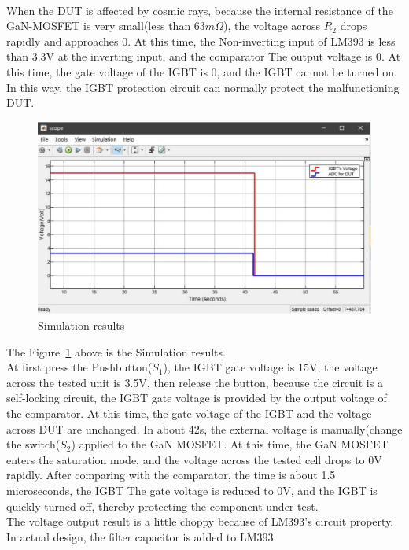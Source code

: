  
\\
When the DUT is affected by cosmic rays, because the internal resistance of the GaN-MOSFET is very small(less than $63m\Omega$), the voltage across $R_{2}$ drops rapidly and approaches 0. At this time, the Non-inverting input of LM393 is less than 3.3V at the inverting input, and the comparator The output voltage is 0. At this time, the gate voltage of the IGBT is 0, and the IGBT cannot be turned on. In this way, the IGBT protection circuit can normally protect the malfunctioning DUT.




\begin{figure}[!ht]
	\centering
	\includegraphics[width=13cm]{grafiken/3.4.pdf}
	\caption{Simulation results} 
	\label{fig:3.4}
\end{figure}
\FloatBarrier
The Figure~\ref{fig:3.4} above is the Simulation results.
\\


At first press the Pushbutton($S_{1}$), the IGBT gate voltage is 15V, the voltage across the tested unit is 3.5V, then release the button, because the circuit is a self-locking circuit, the IGBT gate voltage is provided by the output voltage of the comparator. At this time, the gate voltage of the IGBT and the voltage across DUT are unchanged. In about 42s, the external voltage is manually(change the switch($S_{2}$) applied to the GaN MOSFET. At this time, the GaN MOSFET enters the saturation mode, and the voltage across the tested cell drops to 0V rapidly. After comparing with the comparator, the time is about 1.5 microseconds, the IGBT The gate voltage is reduced to 0V, and the IGBT is quickly turned off, thereby protecting the component under test.
\\
The voltage output result is a little choppy because of LM393’s circuit property. In actual design, the filter capacitor is added to LM393. 

